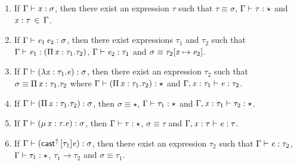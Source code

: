 \begin{lem}\label{lem:gen}
$\quad$
\begin{enumerate}[(1)]
	\item If $\Gamma  \vdash  \mathit{x}  :  \sigma$, then there exist an expression $\tau$ such that $\tau  \equiv  \sigma$, $\Gamma  \vdash  \tau  :  \star$ and $\mathit{x}  :  \tau \, \in \, \Gamma$.
	\item If $\Gamma  \vdash  \mathit{e_{{\mathrm{1}}}} \, \mathit{e_{{\mathrm{2}}}}  :  \sigma$, then there exist expressions $\tau_{{\mathrm{1}}}$ and $\tau_{{\mathrm{2}}}$ such that $\Gamma  \vdash  \mathit{e_{{\mathrm{1}}}}  :  (  \Pi \, \mathit{x}  :  \tau_{{\mathrm{1}}}  .  \tau_{{\mathrm{2}}}  )$, $\Gamma  \vdash  \mathit{e_{{\mathrm{2}}}}  :  \tau_{{\mathrm{1}}}$ and $\sigma  \equiv  \tau_{{\mathrm{2}}}  [  \mathit{x}  \mapsto  \mathit{e_{{\mathrm{2}}}}  ]$.
	\item If $\Gamma  \vdash  (  \lambda  \mathit{x}  :  \tau_{{\mathrm{1}}}  .  \mathit{e}  )  :  \sigma$, then there exist an expression $\tau_{{\mathrm{2}}}$ such that $\sigma  \equiv  \Pi \, \mathit{x}  :  \tau_{{\mathrm{1}}}  .  \tau_{{\mathrm{2}}}$ where $\Gamma  \vdash  (  \Pi \, \mathit{x}  :  \tau_{{\mathrm{1}}}  .  \tau_{{\mathrm{2}}}  )  :  \star$ and $\Gamma  ,  \mathit{x}  :  \tau_{{\mathrm{1}}}  \vdash  \mathit{e}  :  \tau_{{\mathrm{2}}}$.
    \item If $\Gamma  \vdash  (  \Pi \, \mathit{x}  :  \tau_{{\mathrm{1}}}  .  \tau_{{\mathrm{2}}}  )  :  \sigma$, then $\sigma  \equiv  \star$, $\Gamma  \vdash  \tau_{{\mathrm{1}}}  :  \star$ and $\Gamma  ,  \mathit{x}  :  \tau_{{\mathrm{1}}}  \vdash  \tau_{{\mathrm{2}}}  :  \star$.
	\item If $\Gamma  \vdash  (  \mu \, \mathit{x}  :  \tau  .  \mathit{e}  )  :  \sigma$, then $\Gamma  \vdash  \tau  :  \star$, $\sigma  \equiv  \tau$ and $\Gamma  ,  \mathit{x}  :  \tau  \vdash  \mathit{e}  :  \tau$.
	\item If $\Gamma  \vdash  (  \mathsf{cast}^{\uparrow} \, [  \tau_{{\mathrm{1}}}  ]  \mathit{e}  )  :  \sigma$, then there exist an expression $\tau_{{\mathrm{2}}}$ such that $\Gamma  \vdash  \mathit{e}  :  \tau_{{\mathrm{2}}}$, $\Gamma  \vdash  \tau_{{\mathrm{1}}}  :  \star$, $\tau_{{\mathrm{1}}}  \longrightarrow  \tau_{{\mathrm{2}}}$ and $\sigma  \equiv  \tau_{{\mathrm{1}}}$.

\end{enumerate}
\end{lem}

